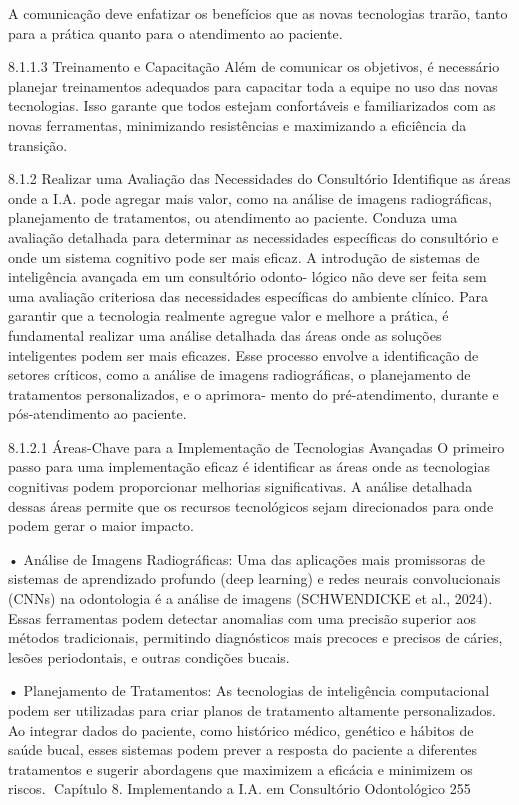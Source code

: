         A comunicação deve enfatizar os benefícios que as novas tecnologias trarão,
tanto para a prática quanto para o atendimento ao paciente.

8.1.1.3   Treinamento e Capacitação
Além de comunicar os objetivos, é necessário planejar treinamentos adequados para
capacitar toda a equipe no uso das novas tecnologias. Isso garante que todos estejam
confortáveis e familiarizados com as novas ferramentas, minimizando resistências e
maximizando a eficiência da transição.

8.1.2     Realizar uma Avaliação das Necessidades do Consultório
Identifique as áreas onde a I.A. pode agregar mais valor, como na análise de imagens
radiográficas, planejamento de tratamentos, ou atendimento ao paciente. Conduza
uma avaliação detalhada para determinar as necessidades específicas do consultório
e onde um sistema cognitivo pode ser mais eficaz.
         A introdução de sistemas de inteligência avançada em um consultório odonto-
lógico não deve ser feita sem uma avaliação criteriosa das necessidades específicas
do ambiente clínico. Para garantir que a tecnologia realmente agregue valor e melhore
a prática, é fundamental realizar uma análise detalhada das áreas onde as soluções
inteligentes podem ser mais eficazes.
       Esse processo envolve a identificação de setores críticos, como a análise de
imagens radiográficas, o planejamento de tratamentos personalizados, e o aprimora-
mento do pré-atendimento, durante e pós-atendimento ao paciente.

8.1.2.1   Áreas-Chave para a Implementação de Tecnologias Avançadas
O primeiro passo para uma implementação eficaz é identificar as áreas onde as
tecnologias cognitivas podem proporcionar melhorias significativas. A análise detalhada
dessas áreas permite que os recursos tecnológicos sejam direcionados para onde
podem gerar o maior impacto.

    • Análise de Imagens Radiográficas: Uma das aplicações mais promissoras de
      sistemas de aprendizado profundo (deep learning) e redes neurais convolucionais
      (CNNs) na odontologia é a análise de imagens (SCHWENDICKE et al., 2024).
      Essas ferramentas podem detectar anomalias com uma precisão superior aos
      métodos tradicionais, permitindo diagnósticos mais precoces e precisos de cáries,
      lesões periodontais, e outras condições bucais.

    • Planejamento de Tratamentos: As tecnologias de inteligência computacional
      podem ser utilizadas para criar planos de tratamento altamente personalizados.
      Ao integrar dados do paciente, como histórico médico, genético e hábitos de
      saúde bucal, esses sistemas podem prever a resposta do paciente a diferentes
      tratamentos e sugerir abordagens que maximizem a eficácia e minimizem os
      riscos.
Capítulo 8. Implementando a I.A. em Consultório Odontológico                         255



